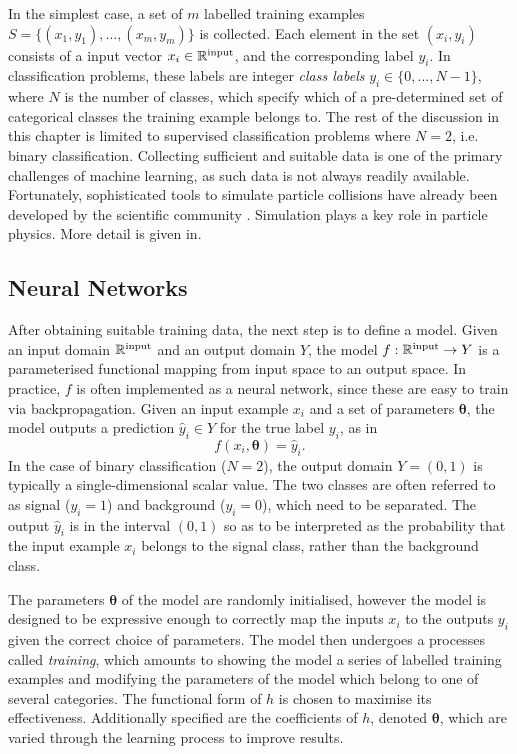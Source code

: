 In the simplest case, a set of $m$ labelled training examples $S = \{ (x_1, y_1) , \ldots , (x_m, y_m) \}$ is collected.
Each element in the set $(x_i, y_i)$ consists of a input vector $x_i  \in \mathbb{R}^{\textnormal{input}}$, and the corresponding label $y_i$.
In classification problems, these labels are integer \textit{class labels} $y_i \in \{0,\ldots,N-1\}$, where $N$ is the number of classes, which specify which of a pre-determined set of categorical classes the training example belongs to.
The rest of the discussion in this chapter is limited to supervised classification problems where $N = 2$, i.e. binary classification.
Collecting sufficient and suitable data is one of the primary challenges of machine learning, as such data is not always readily available.
Fortunately, sophisticated tools to simulate particle collisions have already been developed by the scientific community \cite{leshouchesaccords, leshouchesstandardisation}. Simulation plays a key role in particle physics. More detail is given in.


\subsection{Neural Networks}\label{sec:neural_nets}

After obtaining suitable training data, the next step is to define a model.
Given an input domain $\mathbb{R}^{\textnormal{input}}$ and an output domain $Y$, the model
$f: \mathbb{R}^{\textnormal{input}} \to Y$ is a parameterised functional mapping from input space to an output space.
In practice, $f$ is often implemented as a neural network, since these are easy to train via backpropagation.
Given an input example $x_i$ and a set of parameters $\bm{\theta}$, the model outputs a prediction $\hat{y}_i \in Y$ for the true label $y_i$, as in
%
\begin{equation}
    f(x_i, \bm{\theta}) = \hat{y}_i .
\end{equation}
%
In the case of binary classification ($N = 2$), the output domain $Y = (0, 1)$ is typically a single-dimensional scalar value.
The two classes are often referred to as signal ($y_i = 1$) and background ($y_i = 0$), which need to be separated.
The output $\hat{y}_i$ is in the interval $(0, 1)$ so as to be interpreted as the probability that the input example $x_i$ belongs to the signal class, rather than the background class.

The parameters $\bm{\theta}$ of the model are randomly initialised, however the model is designed to be expressive enough to correctly map the inputs $x_i$ to the outputs $y_i$ given the correct choice of parameters.
The model then undergoes a processes  called \textit{training}, which amounts to showing the model a series of labelled training examples and modifying the parameters of the model which belong to one of several categories.
The functional form of $h$ is chosen to maximise its effectiveness. Additionally specified are the coefficients of $h$, denoted $\bm\theta$, which are varied through the learning process to improve results. 

